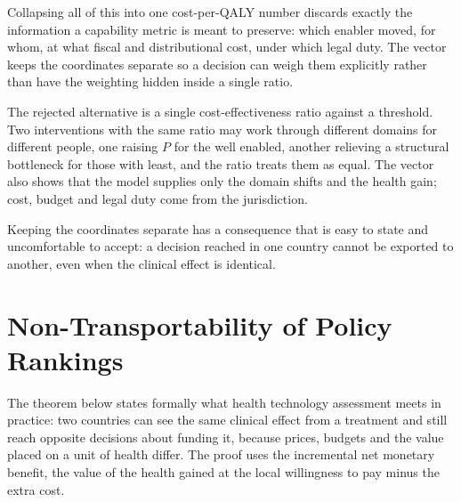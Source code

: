 \begin{reading}
Collapsing all of this into one cost-per-QALY number discards exactly the
information a capability metric is meant to preserve: which enabler moved, for whom,
at what fiscal and distributional cost, under which legal duty. The vector keeps the
coordinates separate so a decision can weigh them explicitly rather than have the
weighting hidden inside a single ratio.
\end{reading}

The rejected alternative is a single cost-effectiveness ratio against a
threshold. Two interventions with the same ratio may work through different
domains for different people, one raising $P$ for the well enabled, another
relieving a structural bottleneck for those with least, and the ratio treats
them as equal. The vector also shows that the model supplies only the domain
shifts and the health gain; cost, budget and legal duty come from the
jurisdiction.

Keeping the coordinates separate has a consequence that is easy to state and
uncomfortable to accept: a decision reached in one country cannot be exported
to another, even when the clinical effect is identical.

\section{Non-Transportability of Policy Rankings}
\label{sec:E-transport}
The theorem below states formally what health technology assessment meets in
practice: two countries can see the same clinical effect from a treatment and
still reach opposite decisions about funding it, because prices, budgets and the
value placed on a unit of health differ. The proof uses the incremental net
monetary benefit, the value of the health gained at the local willingness to
pay minus the extra cost.

